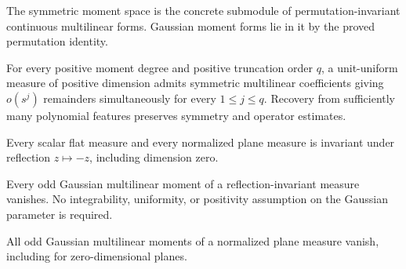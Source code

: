 \begin{definition}
\label{def:symmetric-moment-form}

The symmetric moment space is the concrete submodule of permutation-invariant continuous multilinear forms. Gaussian moment forms lie in it by the proved permutation identity.
\end{definition}

\begin{lemma}
\label{lem:finite-moment-taylor-jets}

For every positive moment degree and positive truncation order $q$, a unit-uniform measure of positive dimension admits symmetric multilinear coefficients giving $o(s^j)$ remainders simultaneously for every $1\leq j\leq q$. Recovery from sufficiently many polynomial features preserves symmetry and operator estimates.
\end{lemma}

\begin{lemma}
\label{lem:flat-measure-reflection}

Every scalar flat measure and every normalized plane measure is invariant under reflection $z\mapsto-z$, including dimension zero.
\end{lemma}

\begin{lemma}
\label{lem:reflection-odd-gaussian-moments}

Every odd Gaussian multilinear moment of a reflection-invariant measure vanishes. No integrability, uniformity, or positivity assumption on the Gaussian parameter is required.
\end{lemma}

\begin{lemma}
\label{lem:flat-gaussian-odd-moments}

All odd Gaussian multilinear moments of a normalized plane measure vanish, including for zero-dimensional planes.
\end{lemma}

